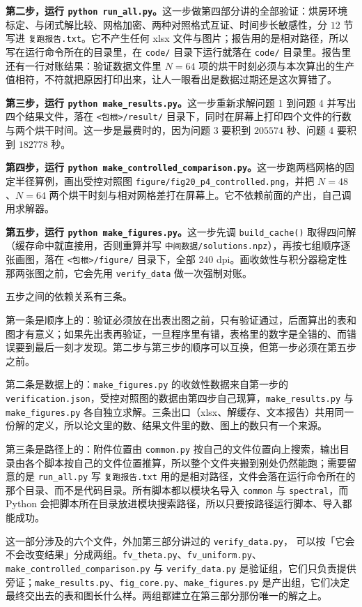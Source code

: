 \textbf{第二步，运行 \texttt{python run\_all.py}。}这一步做第四部分讲的全部验证：烘房环境标定、与闭式解比较、网格加密、两种对照格式互证、时间步长敏感性，分 $12$ 节写进 \texttt{复跑报告.txt}。它不产生任何 xlsx 文件与图片；报告用的是相对路径，所以写在运行命令所在的目录里，在 \texttt{code/} 目录下运行就落在 \texttt{code/} 目录里。报告里还有一行对账结果：验证数据文件里 $N=64$ 项的烘干时刻必须与本次算出的生产值相符，不符就把原因打印出来，让人一眼看出是数据过期还是这次算错了。

\textbf{第三步，运行 \texttt{python make\_results.py}。}这一步重新求解问题 1 到问题 4 并写出四个结果文件，落在 \texttt{<包根>/result/} 目录下，同时在屏幕上打印四个文件的行数与两个烘干时间。这一步是最费时的，因为问题 3 要积到 $205574$ 秒、问题 4 要积到 $182778$ 秒。

\textbf{第四步，运行 \texttt{python make\_controlled\_comparison.py}。}这一步跑两档网格的固定半径算例，画出受控对照图 \texttt{figure/fig20\_p4\_controlled.png}，并把 $N=48$、$N=64$ 两个烘干时刻与相对网格差打在屏幕上。它不依赖前面的产出，自己调用求解器。

\textbf{第五步，运行 \texttt{python make\_figures.py}。}这一步先调 \texttt{build\_cache()} 取得四问解（缓存命中就直接用，否则重算并写 \texttt{中间数据/solutions.npz}），再按七组顺序逐张画图，落在 \texttt{<包根>/figure/} 目录下，全部 $240$ dpi。画收敛性与积分器稳定性那两张图之前，它会先用 \texttt{verify\_data} 做一次强制对账。

五步之间的依赖关系有三条。

第一条是顺序上的：验证必须放在出表出图之前，只有验证通过，后面算出的表和图才有意义；如果先出表再验证，一旦程序里有错，表格里的数字是全错的、而错误要到最后一刻才发现。第二步与第三步的顺序可以互换，但第一步必须在第五步之前。

第二条是数据上的：\texttt{make\_figures.py} 的收敛性数据来自第一步的 \texttt{verification.json}，受控对照图的数据由第四步自己现算，\texttt{make\_results.py} 与 \texttt{make\_figures.py} 各自独立求解。三条出口（xlsx、解缓存、文本报告）共用同一份解的定义，所以论文里的数、结果文件里的数、图上的数只有一个来源。

第三条是路径上的：附件位置由 \texttt{common.py} 按自己的文件位置向上搜索，输出目录由各个脚本按自己的文件位置推算，所以整个文件夹搬到别处仍然能跑；需要留意的是 \texttt{run\_all.py} 写 \texttt{复跑报告.txt} 用的是相对路径，文件会落在运行命令所在的那个目录、而不是代码目录。所有脚本都以模块名导入 \texttt{common} 与 \texttt{spectral}，而 Python 会把脚本所在目录放进模块搜索路径，所以只要按路径运行脚本、导入都能成功。

\keypoint
这一部分涉及的六个文件，外加第三部分讲过的 \texttt{verify\_data.py}，
可以按「它会不会改变结果」分成两组。\texttt{fv\_theta.py}、\texttt{fv\_uniform.py}、\texttt{make\_controlled\_comparison.py} 与 \texttt{verify\_data.py} 是验证组，它们只负责提供旁证；\texttt{make\_results.py}、\texttt{fig\_core.py}、\texttt{make\_figures.py} 是产出组，它们决定最终交出去的表和图长什么样。两组都建立在第三部分那份唯一的解之上。
